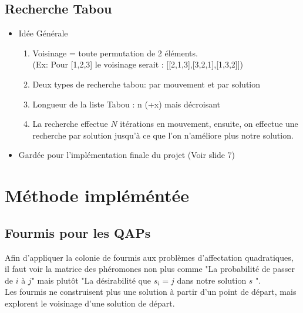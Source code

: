 \documentclass[b]{beamer}
\begin{document}
\subsection{Recherche Tabou}
\begin{frame}
	\begin{itemize}
		\item Idée Générale\\
		\begin{enumerate}
			\item Voisinage = toute permutation de 2 éléments.\\
			(Ex: Pour [1,2,3] le voisinage serait : [[2,1,3],[3,2,1],[1,3,2]])
			\item Deux types de recherche tabou: par mouvement et par solution
			\item Longueur de la liste Tabou : n (+x) mais décroisant
			\item La recherche effectue $N$ itérations en mouvement, ensuite, on effectue une recherche par solution jusqu'à ce que l'on n'améliore plus notre solution.
		\end{enumerate}
		\item Gardée pour l'implémentation finale du projet (Voir slide 7)
	\end{itemize}
\end{frame}


\section{Méthode impléméntée}
\subsection{Fourmis pour les QAPs}
\begin{frame}

Afin d'appliquer la colonie de fourmis aux problèmes d'affectation quadratiques, il faut voir la matrice des phéromones non plus comme "La probabilité de passer de $i$ à $j$" mais plutôt "La désirabilité que $s_i=j$ dans notre solution $s$ ". \\
Les fourmis ne construisent plus une solution à partir d'un point de départ, mais explorent le voisinage d'une solution de départ.\\
\end{frame}
\end{document}
